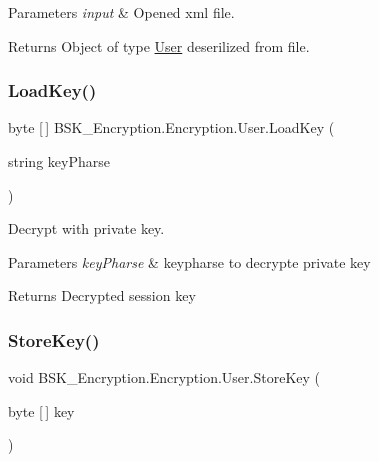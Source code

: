 \begin{DoxyParams}{Parameters}
{\em input} & Opened xml file.\\
\hline
\end{DoxyParams}
\begin{DoxyReturn}{Returns}
Object of type {\ttfamily \mbox{\hyperlink{class_b_s_k___encryption_1_1_encryption_1_1_user}{User}}} deserilized from file.
\end{DoxyReturn}
\mbox{\label{class_b_s_k___encryption_1_1_encryption_1_1_user_a60bacb1a794eae94f4f38e3fc3801e03}} 
\subsubsection{\texorpdfstring{Load\+Key()}{LoadKey()}}
{\footnotesize\ttfamily byte \mbox{[}$\,$\mbox{]} B\+S\+K\+\_\+\+Encryption.\+Encryption.\+User.\+Load\+Key (\begin{DoxyParamCaption}\item[{string}]{key\+Pharse }\end{DoxyParamCaption})}



Decrypt with private key. 


\begin{DoxyParams}{Parameters}
{\em key\+Pharse} & keypharse to decrypte private key\\
\hline
\end{DoxyParams}
\begin{DoxyReturn}{Returns}
Decrypted session key
\end{DoxyReturn}
\mbox{\label{class_b_s_k___encryption_1_1_encryption_1_1_user_a7f44735ece5103022d100d3b5780e82d}} 
\subsubsection{\texorpdfstring{Store\+Key()}{StoreKey()}}
{\footnotesize\ttfamily void B\+S\+K\+\_\+\+Encryption.\+Encryption.\+User.\+Store\+Key (\begin{DoxyParamCaption}\item[{byte \mbox{[}$\,$\mbox{]}}]{key }\end{DoxyParamCaption})}



